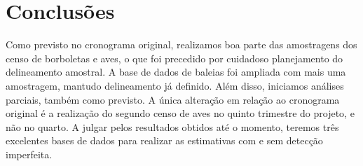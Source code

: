 \section{Conclusões} %
Como previsto no cronograma original, realizamos boa parte das amostragens dos censo de borboletas e aves,
o que foi precedido por cuidadoso planejamento do delineamento amostral. 
A base de dados de baleias foi ampliada com mais uma
amostragem, mantudo delineamento já definido. Além disso, iniciamos análises parciais, também como previsto.
A única alteração em relação ao cronograma original é a realização do segundo censo de aves no quinto trimestre 
do projeto, e não no quarto. 
A julgar pelos resultados obtidos até o momento, teremos três excelentes bases de dados para realizar
as estimativas com e sem detecção imperfeita.